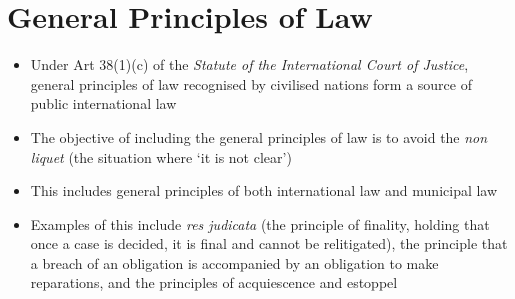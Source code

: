 \section{General Principles of Law}
\begin{itemize}
    \item Under Art 38(1)(c) of the \textit{Statute of the International Court of Justice}, general principles of law recognised by civilised nations form a source of public international law
    \item The objective of including the general principles of law is to avoid the \textit{non liquet} (the situation where `it is not clear')
    \item This includes general principles of both international law and municipal law
    \item Examples of this include \textit{res judicata} (the principle of finality, holding that once a case is decided, it is final and cannot be relitigated), the principle that a breach of an obligation is accompanied by an obligation to make reparations, and the principles of acquiescence and estoppel
\end{itemize}

